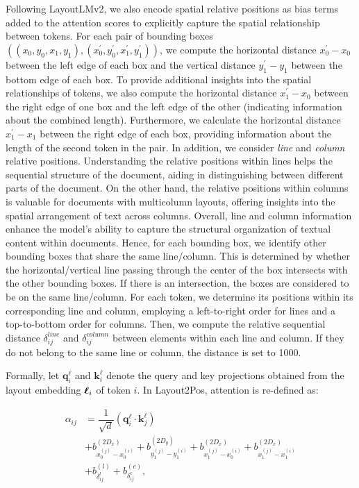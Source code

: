 Following LayoutLMv2, we also encode spatial relative positions as bias terms added to the attention scores to explicitly capture the spatial relationship between tokens. For each pair of bounding boxes $((x_0, y_0, x_1, y_1), (x^{\prime}_0, y^{\prime}_0, x^{\prime}_1, y^{\prime}_1))$, we compute the horizontal distance $x^{\prime}_0 - x_0$ between the left edge of each box and the vertical distance $y^{\prime}_1 - y_1$ between the bottom edge of each box. To provide additional insights into the spatial relationships of tokens, we also compute the horizontal distance $x^{\prime}_1 - x_0$ between the right edge of one box and the left edge of the other (indicating information about the combined length). Furthermore, we calculate the horizontal distance $x^{\prime}_1 - x_1$ between the right edge of each box, providing information about the length of the second token in the pair. In addition, we consider \textit{line} and \textit{column} relative positions. Understanding the relative positions within lines helps the sequential structure of the document, aiding in distinguishing between different parts of the document. On the other hand, the relative positions within columns is valuable for documents with multicolumn layouts, offering insights into the spatial arrangement of text across columns. Overall, line and column information enhance the model's ability to capture the structural organization of textual content within documents. Hence, for each bounding box, we identify other bounding boxes that share the same line/column. This is determined by whether the horizontal/vertical line passing through the center of the box intersects with the other bounding boxes. If there is an intersection, the boxes are considered to be on the same line/column. For each token, we determine its positions within its corresponding line and column, employing a left-to-right order for lines and a top-to-bottom order for columns. Then, we compute the relative sequential distance $\delta^{line}_{ij}$ and $\delta^{column}_{ij}$ between elements within each line and column. If they do not belong to the same line or column, the distance is set to 1000. 

Formally, let $\bm{q}^{\ell}_i$ and $\bm{k}^{\ell}_i$ denote the query and key projections obtained from the layout embedding $\boldsymbol{\ell}_i$ of token $i$. In Layout2Pos, attention is re-defined as:

\begin{equation}
  \begin{split}
  \alpha_{ij} &= \dfrac{1}{\sqrt{d}} \left(\bm{q}^{\ell}_i \cdot \bm{k}^{\ell}_j\right) \\
              & + b^{(2D_x)}_{x^{(j)}_{0} - x^{(i)}_{0}} + b^{(2D_y)}_{y^{(j)}_{1} - y^{(i)}_{1}} + b^{(2D_x)}_{x^{(j)}_{1} - x^{(i)}_{0}} + b^{(2D_x)}_{x^{(j)}_{1} - x^{(i)}_{1}} \\
              & + b^{(l)}_{\delta^{l}_{ij}}  + b^{(c)}_{\delta^{c}_{ij}},
  \end{split}
  \label{eq:layout2pos-attention}
\end{equation}

